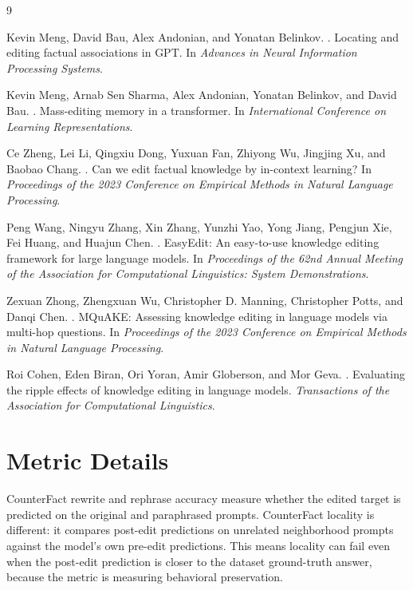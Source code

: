 \documentclass[11pt]{article}
\begin{document}
\begin{thebibliography}{9}

Kevin Meng, David Bau, Alex Andonian, and Yonatan Belinkov.
.
\newblock Locating and editing factual associations in GPT.
\newblock In \emph{Advances in Neural Information Processing Systems}.

Kevin Meng, Arnab Sen Sharma, Alex Andonian, Yonatan Belinkov, and David Bau.
.
\newblock Mass-editing memory in a transformer.
\newblock In \emph{International Conference on Learning Representations}.

Ce Zheng, Lei Li, Qingxiu Dong, Yuxuan Fan, Zhiyong Wu, Jingjing Xu, and Baobao Chang.
.
\newblock Can we edit factual knowledge by in-context learning?
\newblock In \emph{Proceedings of the 2023 Conference on Empirical Methods in Natural Language Processing}.

Peng Wang, Ningyu Zhang, Xin Zhang, Yunzhi Yao, Yong Jiang, Pengjun Xie, Fei Huang, and Huajun Chen.
.
\newblock EasyEdit: An easy-to-use knowledge editing framework for large language models.
\newblock In \emph{Proceedings of the 62nd Annual Meeting of the Association for Computational Linguistics: System Demonstrations}.

Zexuan Zhong, Zhengxuan Wu, Christopher D. Manning, Christopher Potts, and Danqi Chen.
.
\newblock MQuAKE: Assessing knowledge editing in language models via multi-hop questions.
\newblock In \emph{Proceedings of the 2023 Conference on Empirical Methods in Natural Language Processing}.

Roi Cohen, Eden Biran, Ori Yoran, Amir Globerson, and Mor Geva.
.
\newblock Evaluating the ripple effects of knowledge editing in language models.
\newblock \emph{Transactions of the Association for Computational Linguistics}.

\end{thebibliography}

\appendix

\section{Metric Details}

CounterFact rewrite and rephrase accuracy measure whether the edited target is predicted on the original and paraphrased prompts. CounterFact locality is different: it compares post-edit predictions on unrelated neighborhood prompts against the model's own pre-edit predictions. This means locality can fail even when the post-edit prediction is closer to the dataset ground-truth answer, because the metric is measuring behavioral preservation.
\end{document}
